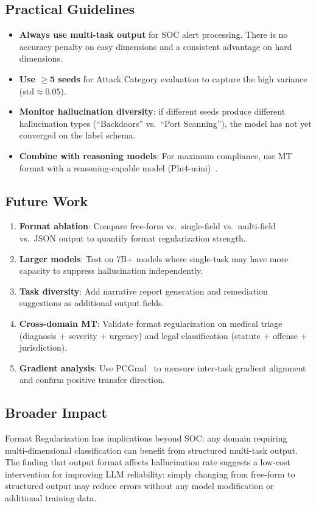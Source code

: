 \documentclass[review,3p]{elsarticle}
\begin{document}
\subsection{Practical Guidelines}
\begin{itemize}
\item \textbf{Always use multi-task output} for SOC alert processing. There is no accuracy penalty on easy dimensions and a consistent advantage on hard dimensions.
\item \textbf{Use $\geq$5 seeds} for Attack Category evaluation to capture the high variance ($\text{std} \approx 0.05$).
\item \textbf{Monitor hallucination diversity}: if different seeds produce different hallucination types (``Backdoors'' vs.\ ``Port Scanning''), the model has not yet converged on the label schema.
\item \textbf{Combine with reasoning models}: For maximum compliance, use MT format with a reasoning-capable model (Phi4-mini)~\cite{p21}.
\end{itemize}

\subsection{Future Work}
\begin{enumerate}
\item \textbf{Format ablation}: Compare free-form vs.\ single-field vs.\ multi-field vs.\ JSON output to quantify format regularization strength.
\item \textbf{Larger models}: Test on 7B+ models where single-task may have more capacity to suppress hallucination independently.
\item \textbf{Task diversity}: Add narrative report generation and remediation suggestions as additional output fields.
\item \textbf{Cross-domain MT}: Validate format regularization on medical triage (diagnosis + severity + urgency) and legal classification (statute + offense + jurisdiction).
\item \textbf{Gradient analysis}: Use PCGrad~\cite{yu2020} to measure inter-task gradient alignment and confirm positive transfer direction.
\end{enumerate}

\subsection{Broader Impact}
Format Regularization has implications beyond SOC: any domain requiring multi-dimensional classification can benefit from structured multi-task output. The finding that output format affects hallucination rate suggests a low-cost intervention for improving LLM reliability: simply changing from free-form to structured output may reduce errors without any model modification or additional training data.
\end{document}
